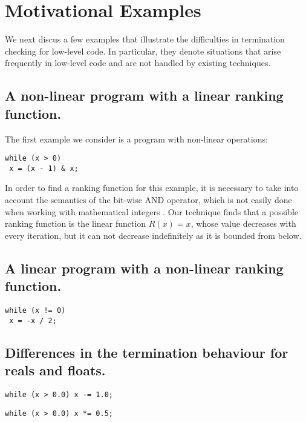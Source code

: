 \documentclass[preprint]{sigplanconf}
\theoremstyle{definition}
\begin{document}

\section{Motivational Examples} 
We next discus a few examples that illustrate the difficulties in termination checking for low-level code. In particular, they denote situations that arise 
frequently in low-level code and are not handled by existing techniques. 


\subsection{A non-linear program with a linear ranking function.}
The first example we consider is a program with non-linear operations: 
\begin{lstlisting}
while (x > 0)
 x = (x - 1) & x;
\end{lstlisting}

In order to find a ranking function for this example, it is necessary to take into account
the semantics of the bit-wise AND operator, which is not easily done when working with mathematical integers \cite{}.
Our technique finds that a possible ranking function is the linear function
$R(x) = x$, whose value decreases with
every iteration, but it can not decrease indefinitely as it is bounded from below.

\subsection{A linear program with a non-linear ranking function.}
\begin{lstlisting}
while (x != 0)
 x = -x / 2;
\end{lstlisting}

\subsection{Differences in the termination behaviour for reals and floats.}
\begin{lstlisting}
while (x > 0.0) x -= 1.0;
\end{lstlisting}

\begin{lstlisting}
while (x > 0.0) x *= 0.5;
\end{lstlisting}
\end{document}
